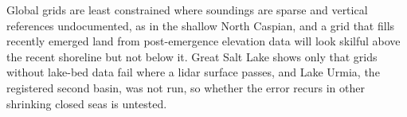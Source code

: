Global grids are least constrained where soundings are sparse and vertical references undocumented\citep{weatherall2015,gebco2026}, as in the shallow North Caspian, and a grid that fills recently emerged land from post-emergence elevation data will look skilful above the recent shoreline but not below it. Great Salt Lake shows only that grids without lake-bed data fail where a lidar surface passes, and Lake Urmia, the registered second basin, was not run, so whether the error recurs in other shrinking closed seas is untested.
